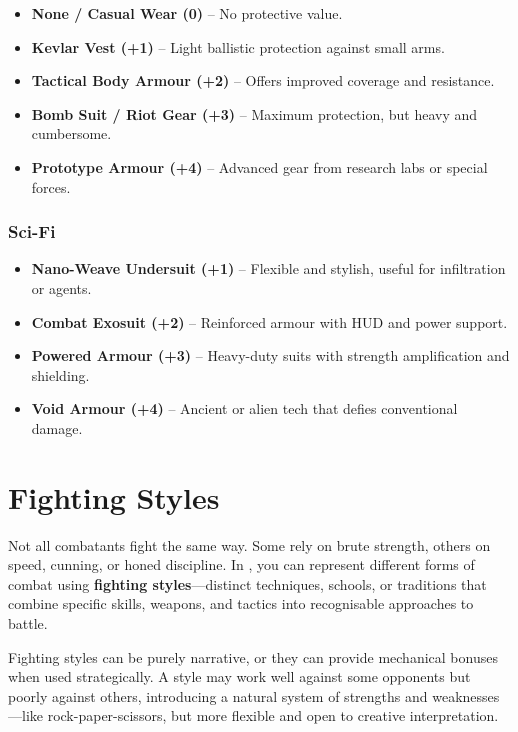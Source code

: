 \begin{multicols}{2}
\begin{itemize}
  \item \textbf{None / Casual Wear (0)} – No protective value.
  \item \textbf{Kevlar Vest (+1)} – Light ballistic protection against small arms.
  \item \textbf{Tactical Body Armour (+2)} – Offers improved coverage and resistance.
  \item \textbf{Bomb Suit / Riot Gear (+3)} – Maximum protection, but heavy and cumbersome.
  \item \textbf{Prototype Armour (+4)} – Advanced gear from research labs or special forces.
\end{itemize}

\subsubsection*{Sci-Fi}

\begin{itemize}
  \item \textbf{Nano-Weave Undersuit (+1)} – Flexible and stylish, useful for infiltration or agents.
  \item \textbf{Combat Exosuit (+2)} – Reinforced armour with HUD and power support.
  \item \textbf{Powered Armour (+3)} – Heavy-duty suits with strength amplification and shielding.
  \item \textbf{Void Armour (+4)} – Ancient or alien tech that defies conventional damage.
\end{itemize}



\section{Fighting Styles}

Not all combatants fight the same way. Some rely on brute strength, others on speed, cunning, or honed discipline. In \wyrd, you can represent different forms of combat using \textbf{fighting styles}—distinct techniques, schools, or traditions that combine specific skills, weapons, and tactics into recognisable approaches to battle.

Fighting styles can be purely narrative, or they can provide mechanical bonuses when used strategically. A style may work well against some opponents but poorly against others, introducing a natural system of strengths and weaknesses—like rock-paper-scissors, but more flexible and open to creative interpretation.


\end{multicols}
